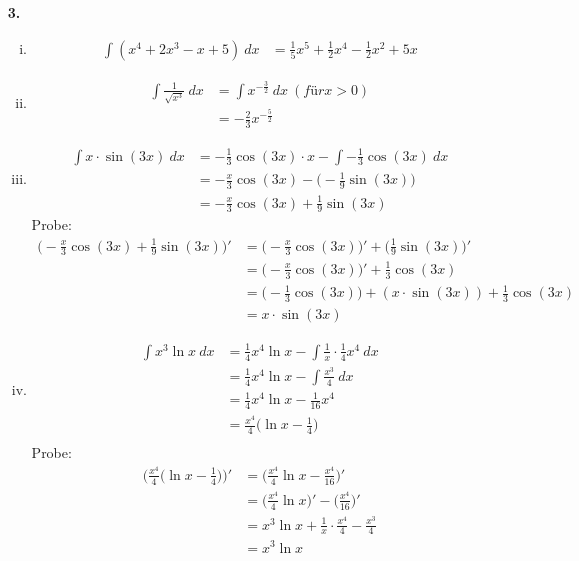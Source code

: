 \documentclass[a4paper]{scrartcl}
\begin{document}
\begin{enumerate}
\item[\textbf{3.}]
\begin{enumerate}[(i)]
\item
\begin{align}
\int(x^4+2x^3-x+5) \ dx 
    &= \frac{1}{5}x^5+\frac{1}{2}x^4-\frac{1}{2}x^2+5x
\end{align}
\item
\begin{align}
\int\frac{1}{\sqrt{x^3}} \ dx 
	&= \int x^{-\frac{3}{2}} \ dx \ (für x>0)\\
	&=-\frac{2}{3}x^{-\frac{5}{2}}
\end{align}
\item
\begin{align}
\int x\cdot\sin(3x) \ dx 
	&= -\frac{1}{3} \cos(3x)\cdot x -\int -\frac{1}{3}\cos (3x) \ dx\\
	&= -\frac{x}{3} \cos(3x)- \Big(-\frac{1}{9} \sin(3x) \Big)\\
	&= -\frac{x}{3} \cos(3x)+ \frac{1}{9}\sin(3x)
\end{align}
Probe:
\begin{align}
\Big(-\frac{x}{3} \cos(3x)+ \frac{1}{9}\sin(3x)\Big)'
	&=\Big(-\frac{x}{3} \cos(3x)\Big)'+\Big(\frac{1}{9}\sin(3x)\Big)'\\
	&=\Big(-\frac{x}{3} \cos(3x)\Big)'+\frac{1}{3}\cos(3x)\\
	&=\Big(-\frac{1}{3}\cos(3x)\Big)+(x\cdot \sin(3x))+\frac{1}{3}\cos(3x)\\
	&=x\cdot \sin(3x)
\end{align}
\newpage
\item
\begin{align}
\int x^3\ln x\ dx
	&=\frac{1}{4}x^4 \ln x-\int \frac{1}{x} \cdot\frac{1}{4} x^4 \ dx\\
	&=\frac{1}{4}x^4 \ln x-\int \frac{x^3}{4}\ dx\\
	&=\frac{1}{4}x^4 \ln x-\frac{1}{16} x^4\\
	&=\frac{x^4}{4}\Big(\ln x-\frac{1}{4}\Big)\\
\end{align}
Probe:
\begin{align}
\Big(\frac{x^4}{4}\Big(\ln x-\frac{1}{4}\Big)\Big)'
	&=\Big(\frac{x^4}{4}\ln x -\frac{x^4}{16}\Big)'\\
	&=\Big(\frac{x^4}{4}\ln x\Big)'-\Big(\frac{x^4}{16}\Big)'\\
	&=x^3 \ln x+ \frac{1}{x}\cdot \frac{x^4}{4}-\frac{x^3}{4}\\
	&=x^3 \ln x
\end{align}

\end{enumerate}
\end{enumerate}
\end{document}
